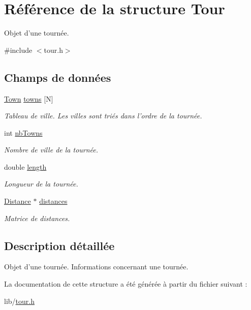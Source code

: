 \hypertarget{structTour}{
\section{Référence de la structure Tour}
\label{structTour}
}


Objet d'une tournée.  




{\ttfamily \#include $<$tour.h$>$}

\subsection*{Champs de données}
\begin{DoxyCompactItemize}
\item 
\hypertarget{structTour_ab50c14f153f1a4b16788d31d9d845c69}{
\hyperlink{structTown}{Town} \hyperlink{structTour_ab50c14f153f1a4b16788d31d9d845c69}{towns} \mbox{[}N\mbox{]}}
\label{structTour_ab50c14f153f1a4b16788d31d9d845c69}

\begin{DoxyCompactList}\small\item\em Tableau de ville. Les villes sont triés dans l'ordre de la tournée. \item\end{DoxyCompactList}\item 
\hypertarget{structTour_af54d0892d0de565850fdf26e98b90a03}{
int \hyperlink{structTour_af54d0892d0de565850fdf26e98b90a03}{nbTowns}}
\label{structTour_af54d0892d0de565850fdf26e98b90a03}

\begin{DoxyCompactList}\small\item\em Nombre de ville de la tournée. \item\end{DoxyCompactList}\item 
\hypertarget{structTour_ad7ec8574d813b76140f78b035cdd93a9}{
double \hyperlink{structTour_ad7ec8574d813b76140f78b035cdd93a9}{length}}
\label{structTour_ad7ec8574d813b76140f78b035cdd93a9}

\begin{DoxyCompactList}\small\item\em Longueur de la tournée. \item\end{DoxyCompactList}\item 
\hypertarget{structTour_a4da8a499459d000a23d79af9d1a5565d}{
\hyperlink{structDistance}{Distance} $\ast$ \hyperlink{structTour_a4da8a499459d000a23d79af9d1a5565d}{distances}}
\label{structTour_a4da8a499459d000a23d79af9d1a5565d}

\begin{DoxyCompactList}\small\item\em Matrice de distances. \item\end{DoxyCompactList}\end{DoxyCompactItemize}


\subsection{Description détaillée}
Objet d'une tournée. Informations concernant une tournée. 

La documentation de cette structure a été générée à partir du fichier suivant :\begin{DoxyCompactItemize}
\item 
lib/\hyperlink{tour_8h}{tour.h}\end{DoxyCompactItemize}
